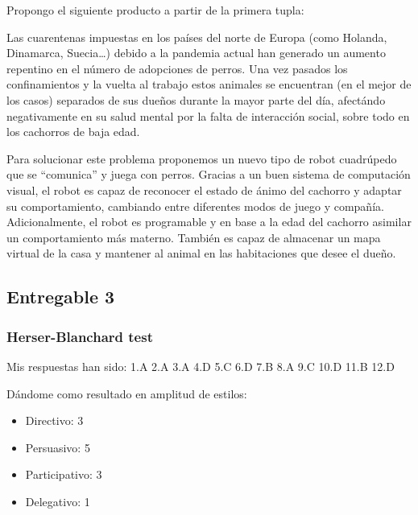 \vspace{\baselineskip}

Propongo el siguiente producto a partir de la primera tupla:

\vspace{\baselineskip}

Las cuarentenas impuestas en los países del norte de Europa (como Holanda, Dinamarca, Suecia\dots) debido a la pandemia actual han generado un aumento repentino en el número de adopciones de perros. 
Una vez pasados los confinamientos y la vuelta al trabajo estos animales se encuentran (en el mejor de los casos) separados de sus dueños durante la mayor parte del día, afectándo negativamente en su salud mental por la falta de interacción social, sobre todo en los cachorros de baja edad.

\vspace{\baselineskip}

Para solucionar este problema proponemos un nuevo tipo de robot cuadrúpedo que se ``comunica'' y juega con perros. Gracias a un buen sistema de computación visual, el robot es capaz de reconocer el estado de ánimo del cachorro y adaptar su comportamiento, cambiando entre diferentes modos de juego y compañía. Adicionalmente, el robot es programable y en base a la edad del cachorro asimilar un comportamiento más materno. También es capaz de almacenar un mapa virtual de la casa y mantener al animal en las habitaciones que desee el dueño.


\subsection{Entregable 3}

\subsubsection{Herser-Blanchard test}

Mis respuestas han sido: 1.A 2.A 3.A 4.D 5.C 6.D 7.B 8.A 9.C 10.D 11.B 12.D

Dándome como resultado en amplitud de estilos:
\begin{itemize}
    \item Directivo: 3
    \item Persuasivo: 5
    \item Participativo: 3
    \item Delegativo: 1
\end{itemize}

